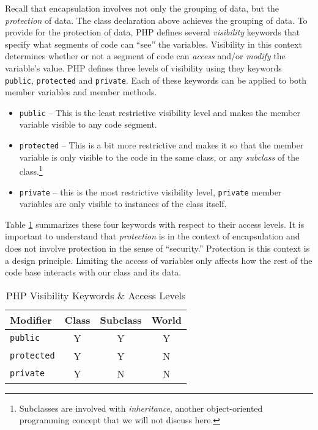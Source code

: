Recall that encapsulation involves not only the grouping of data, but
the \emph{protection} of data.  The class declaration above achieves
the grouping of data.  To provide for the protection of data, PHP
defines several \emph{visibility} keywords that specify what segments
of code can ``see'' the variables.  Visibility in this context determines
whether or not a segment of code can \emph{access} and/or \emph{modify}
the variable's value.  PHP defines three levels of visibility using
they keywords \texttt{public}, \texttt{protected}
and \texttt{private}.  Each of these keywords can
be applied to both member variables and member methods.

\begin{itemize}
  \item \texttt{public} -- This is the least restrictive 
    visibility level and makes the member variable visible to any
    code segment.
  \item \texttt{protected} -- This is a bit more restrictive
    and makes it so that the member variable is only visible to the
    code in the same class, or any \emph{subclass} of the 
    class.\footnote{Subclasses are involved with \emph{inheritance}, 
    another object-oriented programming concept that we will not
    discuss here.}
  \item \texttt{private} -- this is the most restrictive 
    visibility level, \texttt{private} member variables are
    only visible to instances of the class itself.  
\end{itemize}

Table \ref{table:phpVisibilityKeywords} summarizes these four keywords
with respect to their access levels.  It is important to understand that
\emph{protection} is in the context of encapsulation and does not involve
protection in the sense of ``security.''  Protection is this context
is a design principle.  Limiting the access of variables only affects 
how the rest of the code base interacts with our class and its data.  

\begin{table}[h]
\centering
\begin{tabular}{|l|c|c|c|}
\hline
Modifier & Class  & Subclass & World \\
\hline\hline
\texttt{public} & Y  & Y & Y \\
\hline
\texttt{protected} & Y  & Y & N \\
\hline
\texttt{private} & Y & N & N \\
\hline
\end{tabular}
\caption{PHP Visibility Keywords \& Access Levels}
\label{table:phpVisibilityKeywords}
\end{table}

